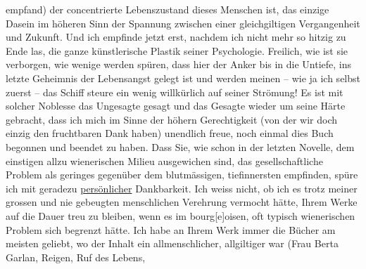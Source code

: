                empfand) der concentrierte Lebenszustand dieses Menschen ist, das einzige Dasein im
               höheren Sinn der Spannung zwischen einer gleichgiltigen Vergangenheit und Zukunft.
               Und ich empfinde jetzt erst, nachdem ich nicht mehr so hitzig zu Ende las, die ganze
                  {\pb}künstlerische Plastik seiner
               Psychologie. Freilich, wie ist sie verborgen, wie wenige werden spüren, dass hier der
               Anker bis in die Untiefe, ins letzte Geheimnis der Lebensangst gelegt ist und werden
               meinen – wie ja ich selbst zuerst – das Schiff steure ein wenig willkürlich auf
               seiner Strömung! Es ist mit solcher Noblesse das Ungesagte gesagt und das Gesagte
               wieder um seine Härte gebracht, dass ich mich im Sinne der höhern Gerechtigkeit (von
               der wir doch einzig den fruchtbaren Dank haben) unendlich freue, noch einmal dies Buch begonnen und beendet zu
               haben. Dass Sie, wie schon in der letzten Novelle, dem einsti{\pb}gen allzu wienerischen Milieu ausgewichen sind, das gesellschaftliche Problem als
               geringes gegenüber dem blutmässigen, tiefinnersten empfinden, spüre ich mit geradezu
                  \uline{persönlicher} Dankbarkeit. Ich weiss nicht, ob ich
               es trotz meiner grossen und nie gebeugten menschlichen Verehrung vermocht hätte,
               Ihrem Werke auf die Dauer treu zu bleiben, wenn es im
               bourg{[}e{]}oisen, oft typisch wienerischen Problem sich begrenzt hätte. Ich habe an Ihrem Werk immer die
               Bücher am meisten geliebt, wo der Inhalt ein allmenschlicher, allgiltiger war (Frau Berta Garlan, Reigen, Ruf des Lebens,
